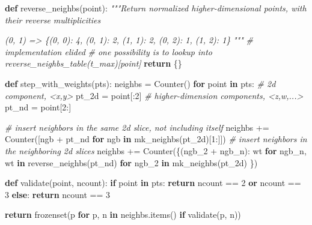 \documentclass[]{article}
\newenvironment{Shaded}{}{}
\newcommand{\BuiltInTok}[1]{#1}
\newcommand{\CommentTok}[1]{\textcolor[rgb]{0.38,0.63,0.69}{\textit{#1}}}
\newcommand{\ControlFlowTok}[1]{\textcolor[rgb]{0.00,0.44,0.13}{\textbf{#1}}}
\newcommand{\DecValTok}[1]{\textcolor[rgb]{0.25,0.63,0.44}{#1}}
\newcommand{\KeywordTok}[1]{\textcolor[rgb]{0.00,0.44,0.13}{\textbf{#1}}}
\newcommand{\NormalTok}[1]{#1}
\newcommand{\OperatorTok}[1]{\textcolor[rgb]{0.40,0.40,0.40}{#1}}
\begin{document}
\begin{Shaded}
\begin{Highlighting}[]
\KeywordTok{def}\NormalTok{ reverse\_neighbs(point):}
    \CommentTok{"""Return normalized higher{-}dimensional points, with their reverse}
\CommentTok{    multiplicities}

\CommentTok{    (0, 1)}
\CommentTok{    => \{(0, 0): 4, (0, 1): 2, (1, 1): 2, (0, 2): 1, (1, 2): 1\}}
\CommentTok{    """}
    \CommentTok{\# implementation elided}
    \CommentTok{\# one possibility is to lookup into reverse\_neighbs\_table(t\_max)[point]}
    \ControlFlowTok{return}\NormalTok{ \{\}}

\KeywordTok{def}\NormalTok{ step\_with\_weights(pts):}
\NormalTok{    neighbs }\OperatorTok{=}\NormalTok{ Counter()}
    \ControlFlowTok{for}\NormalTok{ point }\KeywordTok{in}\NormalTok{ pts:}
        \CommentTok{\# 2d component, <x,y>}
\NormalTok{        pt\_2d }\OperatorTok{=}\NormalTok{ point[:}\DecValTok{2}\NormalTok{]}
        \CommentTok{\# higher{-}dimension components, <z,w,...>}
\NormalTok{        pt\_nd }\OperatorTok{=}\NormalTok{ point[}\DecValTok{2}\NormalTok{:]}

        \CommentTok{\# insert neighbors in the same 2d slice, not including itself}
\NormalTok{        neighbs }\OperatorTok{+=}\NormalTok{ Counter([ngb }\OperatorTok{+}\NormalTok{ pt\_nd }\ControlFlowTok{for}\NormalTok{ ngb }\KeywordTok{in}\NormalTok{ mk\_neighbs(pt\_2d)[}\DecValTok{1}\NormalTok{:]])}
        \CommentTok{\# insert neighbors in the neighboring 2d slices}
\NormalTok{        neighbs }\OperatorTok{+=}\NormalTok{ Counter(\{(ngb\_2 }\OperatorTok{+}\NormalTok{ ngb\_n): wt}
                                \ControlFlowTok{for}\NormalTok{ ngb\_n, wt }\KeywordTok{in}\NormalTok{ reverse\_neighbs(pt\_nd)}
                                \ControlFlowTok{for}\NormalTok{ ngb\_2 }\KeywordTok{in}\NormalTok{ mk\_neighbs(pt\_2d)}
\NormalTok{                          \})}

    \KeywordTok{def}\NormalTok{ validate(point, ncount):}
        \ControlFlowTok{if}\NormalTok{ point }\KeywordTok{in}\NormalTok{ pts:}
            \ControlFlowTok{return}\NormalTok{ ncount }\OperatorTok{==} \DecValTok{2} \KeywordTok{or}\NormalTok{ ncount }\OperatorTok{==} \DecValTok{3}
        \ControlFlowTok{else}\NormalTok{:}
            \ControlFlowTok{return}\NormalTok{ ncount }\OperatorTok{==} \DecValTok{3}

    \ControlFlowTok{return} \BuiltInTok{frozenset}\NormalTok{(p }\ControlFlowTok{for}\NormalTok{ p, n }\KeywordTok{in}\NormalTok{ neighbs.items() }\ControlFlowTok{if}\NormalTok{ validate(p, n))}
\end{Highlighting}
\end{Shaded}
\end{document}

